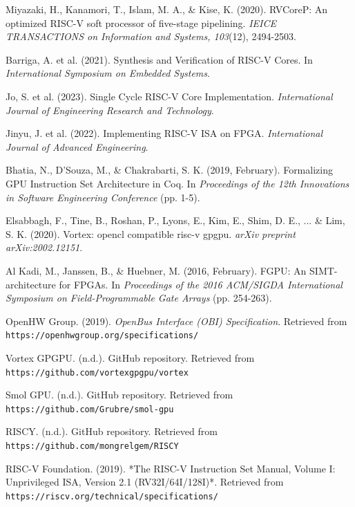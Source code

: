 \documentclass[a4paper,twoside]{article}
\begin{document}
\begin{thebibliography}{99}
Miyazaki, H., Kanamori, T., Islam, M. A., \& Kise, K. (2020). RVCoreP: An optimized RISC-V soft processor of five-stage pipelining. \textit{IEICE TRANSACTIONS on Information and Systems, 103}(12), 2494-2503.

Barriga, A. et al. (2021). Synthesis and Verification of RISC-V Cores. In \textit{International Symposium on Embedded Systems}.

Jo, S. et al. (2023). Single Cycle RISC-V Core Implementation. \textit{International Journal of Engineering Research and Technology}.

Jinyu, J. et al. (2022). Implementing RISC-V ISA on FPGA. \textit{International Journal of Advanced Engineering}.

Bhatia, N., D'Souza, M., \& Chakrabarti, S. K. (2019, February). Formalizing GPU Instruction Set Architecture in Coq. In \textit{Proceedings of the 12th Innovations in Software Engineering Conference} (pp. 1-5).

Elsabbagh, F., Tine, B., Roshan, P., Lyons, E., Kim, E., Shim, D. E., ... \& Lim, S. K. (2020). Vortex: opencl compatible risc-v gpgpu. \textit{arXiv preprint arXiv:2002.12151}.

Al Kadi, M., Janssen, B., \& Huebner, M. (2016, February). FGPU: An SIMT-architecture for FPGAs. In \textit{Proceedings of the 2016 ACM/SIGDA International Symposium on Field-Programmable Gate Arrays} (pp. 254-263).

OpenHW Group. (2019). \textit{OpenBus Interface (OBI) Specification}. Retrieved from \texttt{https://openhwgroup.org/specifications/}

Vortex GPGPU. (n.d.). GitHub repository. Retrieved from \texttt{https://github.com/vortexgpgpu/vortex}

Smol GPU. (n.d.). GitHub repository. Retrieved from \texttt{https://github.com/Grubre/smol-gpu}

RISCY. (n.d.). GitHub repository. Retrieved from \texttt{https://github.com/mongrelgem/RISCY}

RISC-V Foundation. (2019). *The RISC-V Instruction Set Manual, Volume I: Unprivileged ISA, Version 2.1 (RV32I/64I/128I)*. Retrieved from \texttt{https://riscv.org/technical/specifications/}

\end{thebibliography}
\end{document}
